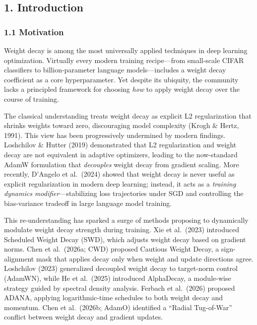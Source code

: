 \documentclass[
]{article}
\begin{document}
\hypertarget{introduction}{%
\subsection{1. Introduction}\label{introduction}}

\hypertarget{motivation}{%
\subsubsection{1.1 Motivation}\label{motivation}}

Weight decay is among the most universally applied techniques in deep
learning optimization. Virtually every modern training recipe---from
small-scale CIFAR classifiers to billion-parameter language
models---includes a weight decay coefficient as a core hyperparameter.
Yet despite its ubiquity, the community lacks a principled framework for
choosing \emph{how} to apply weight decay over the course of training.

The classical understanding treats weight decay as explicit L2
regularization that shrinks weights toward zero, discouraging model
complexity (Krogh \& Hertz, 1991). This view has been progressively
undermined by modern findings. Loshchilov \& Hutter (2019) demonstrated
that L2 regularization and weight decay are not equivalent in adaptive
optimizers, leading to the now-standard AdamW formulation that
\emph{decouples} weight decay from gradient scaling. More recently,
D'Angelo et al.~(2024) showed that weight decay is never useful as
explicit regularization in modern deep learning; instead, it acts as a
\emph{training dynamics modifier}---stabilizing loss trajectories under
SGD and controlling the bias-variance tradeoff in large language model
training.

This re-understanding has sparked a surge of methods proposing to
dynamically modulate weight decay strength during training. Xie et
al.~(2023) introduced Scheduled Weight Decay (SWD), which adjusts weight
decay based on gradient norms. Chen et al.~(2026a; CWD) proposed
Cautious Weight Decay, a sign-alignment mask that applies decay only
when weight and update directions agree. Loshchilov (2023) generalized
decoupled weight decay to target-norm control (AdamWN), while He et
al.~(2025) introduced AlphaDecay, a module-wise strategy guided by
spectral density analysis. Ferbach et al.~(2026) proposed ADANA,
applying logarithmic-time schedules to both weight decay and momentum.
Chen et al.~(2026b; AdamO) identified a ``Radial Tug-of-War'' conflict
between weight decay and gradient updates.
\end{document}
